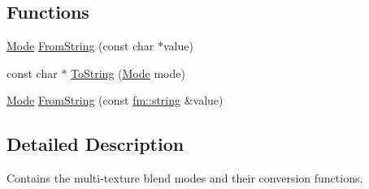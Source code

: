 \subsection*{Functions}
\begin{DoxyCompactItemize}
\item 
\hyperlink{namespaceFUDaeBlendMode_a4b5f740c497b45148449914ab987d2c1}{Mode} \hyperlink{namespaceFUDaeBlendMode_a1444bb4e23727c0dd0f488e55ab79ea3}{FromString} (const char $\ast$value)
\item 
const char $\ast$ \hyperlink{namespaceFUDaeBlendMode_aa7d24e4deca0de79cf755d1e62775d00}{ToString} (\hyperlink{namespaceFUDaeBlendMode_a4b5f740c497b45148449914ab987d2c1}{Mode} mode)
\item 
\hyperlink{namespaceFUDaeBlendMode_a4b5f740c497b45148449914ab987d2c1}{Mode} \hyperlink{namespaceFUDaeBlendMode_acd7e62fc183b89eff22ffb49172c9f64}{FromString} (const \hyperlink{classfm_1_1stringT}{fm::string} \&value)
\end{DoxyCompactItemize}


\subsection{Detailed Description}
Contains the multi-\/texture blend modes and their conversion functions. 

